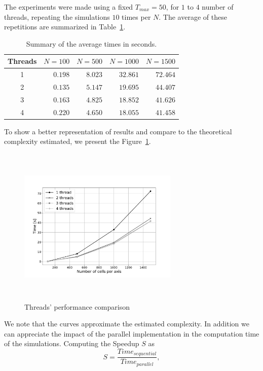 \documentclass[conference]{IEEEtran}
\begin{document}
    The experiments were made using a fixed $T_{max}=50$, for $1$ to $4$ number of threads, repeating the 
    simulations $10$ times per $N$. The average of these repetitions are summarized in Table~\ref{tab:results}.
    
    \begin{table}[h]
      \renewcommand{\arraystretch}{1.3}
      \centering
      \caption{Summary of the average times in seconds.}
      \label{tab:results}
      \begin{tabular}{c||rrrr}
        \hline
        Threads & $N=100$ & $N=500$ & $N=1000$ & $N=1500$ \\ \hline\hline
        1       & $0.198$   & $8.023$   & $32.861$   & $72.464$   \\
        2       & $0.135$   & $5.147$   & $19.695$   & $44.407$   \\
        3       & $0.163$   & $4.825$   & $18.852$   & $41.626$   \\
        4       & $0.220$   & $4.650$   & $18.055$   & $41.458$   \\ \hline
      \end{tabular}
    \end{table}

    To show a better representation of results and compare to the theoretical complexity estimated, we 
    present the Figure~\ref{fig:benchmark}.
    
    \begin{figure}[h]
      \centering
      \includegraphics[width=3in,height=3in,clip,keepaspectratio]{figures/benchmark.pdf}
      \caption{Threads' performance comparison}
      \label{fig:benchmark}
    \end{figure}
    
    We note that the curves approximate the estimated complexity. In addition we can appreciate the impact of 
    the parallel implementation in the computation time of the simulations. Computing the Speedup $S$ as
    \begin{equation}
      S = \frac{Time_{sequential}}{Time_{parallel}},
    \end{equation}
    
\end{document}
